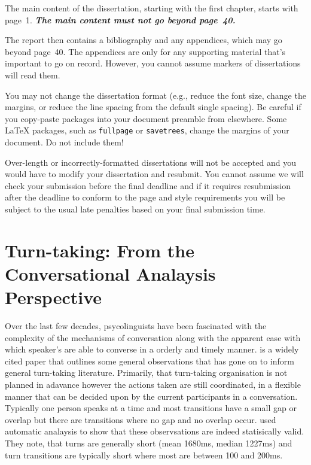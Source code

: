 \documentclass[logo,bsc,singlespacing,parskip]{infthesis}
\begin{document}
The main content of the dissertation, starting with the first chapter,
starts with page~1. \emph{\textbf{The main content must not go beyond page~40.}}

The report then contains a bibliography and any appendices, which may go beyond
page~40. The appendices are only for any supporting material that's important to
go on record. However, you cannot assume markers of dissertations will read them.

You may not change the dissertation format (e.g., reduce the font size, change
the margins, or reduce the line spacing from the default single spacing). Be
careful if you copy-paste packages into your document preamble from elsewhere.
Some \LaTeX{} packages, such as \texttt{fullpage} or \texttt{savetrees}, change
the margins of your document. Do not include them!

Over-length or incorrectly-formatted dissertations will not be accepted and you
would have to modify your dissertation and resubmit. You cannot assume we will
check your submission before the final deadline and if it requires resubmission
after the deadline to conform to the page and style requirements you will be
subject to the usual late penalties based on your final submission time.

\section{Turn-taking: From the Conversational Analaysis Perspective}
Over the last few decades, psycolinguists have been fascinated with the complexity of the mechanisms of conversation along with the apparent ease with which speaker's are able to converse in a orderly and timely manner. 
\cite{Sacks1974} is a widely cited paper that outlines some general observations that has gone on to inform general turn-taking literature. Primarily, that turn-taking organisation is not planned in adavance however the actions taken are still coordinated, in a flexible manner that can be decided upon by the current participants in a conversation. Typically one person speaks at a time and most transitions have a small gap or overlap but there are transitions where no gap and no overlap occur. 
\cite{LevTor2015} used automatic analaysis to show that these observsations are indeed statisically valid. They note, that turns are generally short (mean 1680ms, median 1227ms) and turn transitions are typically short where most are between 100 and 200ms. 
\end{document}
